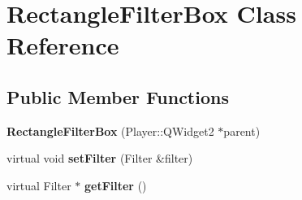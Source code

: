 \hypertarget{classRectangleFilterBox}{}\section{Rectangle\+Filter\+Box Class Reference}
\label{classRectangleFilterBox}
\subsection*{Public Member Functions}
\begin{DoxyCompactItemize}
\item 
\hypertarget{classRectangleFilterBox_aafec3cf732f57eaadb50a882a4227b05}{}{\bfseries Rectangle\+Filter\+Box} (Player\+::\+Q\+Widget2 $\ast$parent)\label{classRectangleFilterBox_aafec3cf732f57eaadb50a882a4227b05}

\item 
\hypertarget{classRectangleFilterBox_a09e99b0db09b8468ce7d7e0f98293ac5}{}virtual void {\bfseries set\+Filter} (Filter \&filter)\label{classRectangleFilterBox_a09e99b0db09b8468ce7d7e0f98293ac5}

\item 
\hypertarget{classRectangleFilterBox_ad7b14770615490d1445c958c79fd3adb}{}virtual Filter $\ast$ {\bfseries get\+Filter} ()\label{classRectangleFilterBox_ad7b14770615490d1445c958c79fd3adb}

\end{DoxyCompactItemize}
